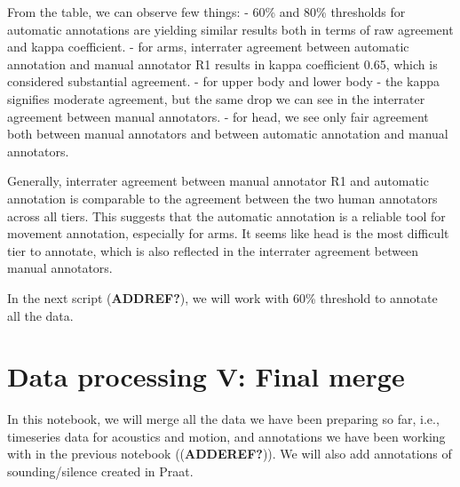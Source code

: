 \documentclass[
  letterpaper,
  DIV=11,
  numbers=noendperiod]{scrreprt}
\begin{document}
From the table, we can observe few things: - 60\% and 80\% thresholds
for automatic annotations are yielding similar results both in terms of
raw agreement and kappa coefficient. - for arms, interrater agreement
between automatic annotation and manual annotator R1 results in kappa
coefficient 0.65, which is considered substantial agreement. - for upper
body and lower body - the kappa signifies moderate agreement, but the
same drop we can see in the interrater agreement between manual
annotators. - for head, we see only fair agreement both between manual
annotators and between automatic annotation and manual annotators.

Generally, interrater agreement between manual annotator R1 and
automatic annotation is comparable to the agreement between the two
human annotators across all tiers. This suggests that the automatic
annotation is a reliable tool for movement annotation, especially for
arms. It seems like head is the most difficult tier to annotate, which
is also reflected in the interrater agreement between manual annotators.

In the next script (\textbf{ADDREF?}), we will work with 60\% threshold
to annotate all the data.


\chapter{Data processing V: Final
merge}\label{data-processing-v-final-merge}

In this notebook, we will merge all the data we have been preparing so
far, i.e., timeseries data for acoustics and motion, and annotations we
have been working with in the previous notebook ((\textbf{ADDEREF?})).
We will also add annotations of sounding/silence created in Praat.
\end{document}
